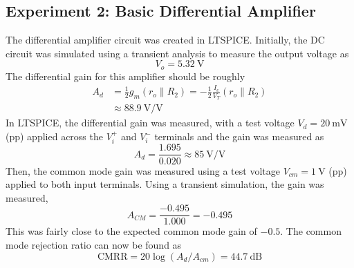 \documentclass{homework}
\begin{document}
	\subsection*{Experiment 2: Basic Differential Amplifier}
	The differential amplifier circuit was created in LTSPICE. Initially, the DC circuit was simulated using a transient analysis to measure the output voltage as 
	\[ V_o = \SI{5.32}{\V} \]
	The differential gain for this amplifier should be roughly \begin{align*}
		A_d & = \frac{1}{2} g_m ( r_o \parallel R_2 ) = -\frac{1}{2} \frac{I_c}{V_T} (r_o \parallel R_2) \\
			& \approx \SI{88.9}{\V/\V}
	\end{align*}
	In LTSPICE, the differential gain was measured, with a test voltage $V_d = \SI{20}{\mV}$ (pp) applied across the $V_i^+$ and $V_i^-$ terminals and the gain was measured as
	\[ A_d = \frac{1.695}{0.020} \approx \SI{85}{\V/\V} \]
	Then, the common mode gain was measured using a test voltage $V_{cm} = \SI{1}{\V}$ (pp) applied to both input terminals. Using a transient simulation, the gain was measured,
	\[ A_{CM} = \frac{-0.495}{1.000} = -0.495\]
	This was fairly close to the expected common mode gain of $-0.5$. The common mode rejection ratio can now be found as
	\[\mathrm{CMRR} = 20 \log(A_d / A_{cm}) = \SI{44.7}{\dB} \]
	
	
\end{document}
